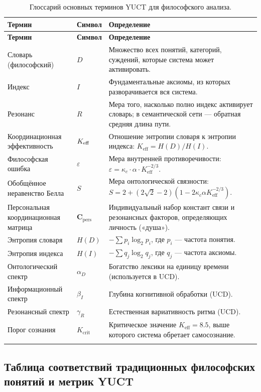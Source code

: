\documentclass[12pt,a4paper]{article}
\newcommand{\kappac}{\kappa_c}
\newcommand{\eps}{\varepsilon}
\newcommand{\Cpers}{\mathbf{C}_{\text{pers}}}
\begin{document}
	\begin{longtable}{p{3.5cm}p{5cm}p{4cm}}
		\toprule
		\textbf{Термин} & \textbf{Символ} & \textbf{Определение} \\
		\midrule
		\endfirsthead
		\toprule
		\textbf{Термин} & \textbf{Символ} & \textbf{Определение} \\
		\midrule
		\endhead
		Словарь (философский) & \(D\) & Множество всех понятий, категорий, суждений, которые система может активировать. \\
		Индекс & \(I\) & Фундаментальные аксиомы, из которых разворачивается вся система. \\
		Резонанс & \(R\) & Мера того, насколько полно индекс активирует словарь; в семантической сети — обратная средняя длина пути. \\
		Координационная эффективность & \(\Keff\) & Отношение энтропии словаря к энтропии индекса: \(K_{\mathrm{eff}} = H(D)/H(I)\). \\
		Философская ошибка & \(\eps\) & Мера внутренней противоречивости: \(\eps = \kappac \cdot \alpha \cdot K_{\mathrm{eff}}^{-2/3}\). \\
		Обобщённое неравенство Белла & \(S\) & Мера онтологической связности: \(S = 2 + (2\sqrt{2}-2)(1 - 2\kappac\alpha K_{\mathrm{eff}}^{-2/3})\). \\
		Персональная координационная матрица & \(\Cpers\) & Индивидуальный набор констант связи и резонансных факторов, определяющих личность («душа»). \\
		Энтропия словаря & \(H(D)\) & \( -\sum p_i \log_2 p_i\), где \(p_i\) — частота понятия. \\
		Энтропия индекса & \(H(I)\) & \( -\sum q_j \log_2 q_j\), где \(q_j\) — частота аксиомы. \\
		Онтологический спектр & \(\alpha_D\) & Богатство лексики на единицу времени (используется в UCD). \\
		Информационный спектр & \(\beta_I\) & Глубина когнитивной обработки (UCD). \\
		Резонансный спектр & \(\gamma_R\) & Естественная вариативность ритма (UCD). \\
		Порог сознания & \(K_{\mathrm{crit}}\) & Критическое значение \(K_{\mathrm{eff}} = 8.5\), выше которого система обретает самосознание. \\
		\bottomrule
		\caption{Глоссарий основных терминов YUCT для философского анализа.}
		\label{tab:glossary}
	\end{longtable}
	
	\subsection{Таблица соответствий традиционных философских понятий и метрик YUCT}
	
\end{document}

